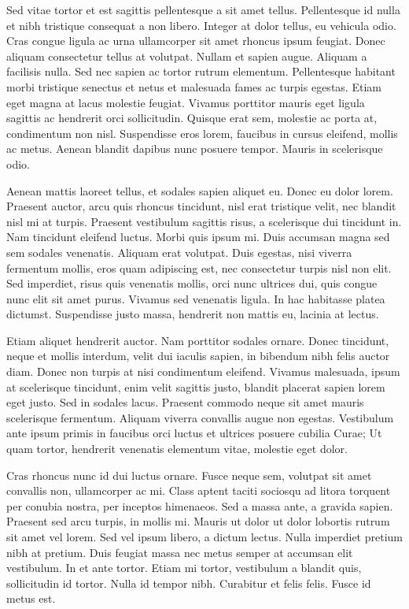 Sed vitae tortor et est sagittis pellentesque a sit amet tellus.
Pellentesque id nulla et nibh tristique consequat a non libero.
Integer at dolor tellus, eu vehicula odio.
Cras congue ligula ac urna ullamcorper sit amet rhoncus ipsum feugiat.
Donec aliquam consectetur tellus at volutpat.
Nullam et sapien augue.
Aliquam a facilisis nulla.
Sed nec sapien ac tortor rutrum elementum.
Pellentesque habitant morbi tristique senectus et netus et malesuada fames ac turpis egestas.
Etiam eget magna at lacus molestie feugiat.
Vivamus porttitor mauris eget ligula sagittis ac hendrerit orci sollicitudin.
Quisque erat sem, molestie ac porta at, condimentum non nisl.
Suspendisse eros lorem, faucibus in cursus eleifend, mollis ac metus.
Aenean blandit dapibus nunc posuere tempor.
Mauris in scelerisque odio.

Aenean mattis laoreet tellus, et sodales sapien aliquet eu.
Donec eu dolor lorem.
Praesent auctor, arcu quis rhoncus tincidunt, nisl erat tristique velit, nec blandit nisl mi at turpis.
Praesent vestibulum sagittis risus, a scelerisque dui tincidunt in.
Nam tincidunt eleifend luctus.
Morbi quis ipsum mi.
Duis accumsan magna sed sem sodales venenatis.
Aliquam erat volutpat.
Duis egestas, nisi viverra fermentum mollis, eros quam adipiscing est, nec consectetur turpis nisl non elit.
Sed imperdiet, risus quis venenatis mollis, orci nunc ultrices dui, quis congue nunc elit sit amet purus.
Vivamus sed venenatis ligula.
In hac habitasse platea dictumst.
Suspendisse justo massa, hendrerit non mattis eu, lacinia at lectus.

Etiam aliquet hendrerit auctor.
Nam porttitor sodales ornare.
Donec tincidunt, neque et mollis interdum, velit dui iaculis sapien, in bibendum nibh felis auctor diam.
Donec non turpis at nisi condimentum eleifend.
Vivamus malesuada, ipsum at scelerisque tincidunt, enim velit sagittis justo, blandit placerat sapien lorem eget justo.
Sed in sodales lacus.
Praesent commodo neque sit amet mauris scelerisque fermentum.
Aliquam viverra convallis augue non egestas.
Vestibulum ante ipsum primis in faucibus orci luctus et ultrices posuere cubilia Curae; Ut quam tortor, hendrerit venenatis elementum vitae, molestie eget dolor.

Cras rhoncus nunc id dui luctus ornare.
Fusce neque sem, volutpat sit amet convallis non, ullamcorper ac mi.
Class aptent taciti sociosqu ad litora torquent per conubia nostra, per inceptos himenaeos.
Sed a massa ante, a gravida sapien.
Praesent sed arcu turpis, in mollis mi.
Mauris ut dolor ut dolor lobortis rutrum sit amet vel lorem.
Sed vel ipsum libero, a dictum lectus.
Nulla imperdiet pretium nibh at pretium.
Duis feugiat massa nec metus semper at accumsan elit vestibulum.
In et ante tortor.
Etiam mi tortor, vestibulum a blandit quis, sollicitudin id tortor.
Nulla id tempor nibh.
Curabitur et felis felis.
Fusce id metus est.

